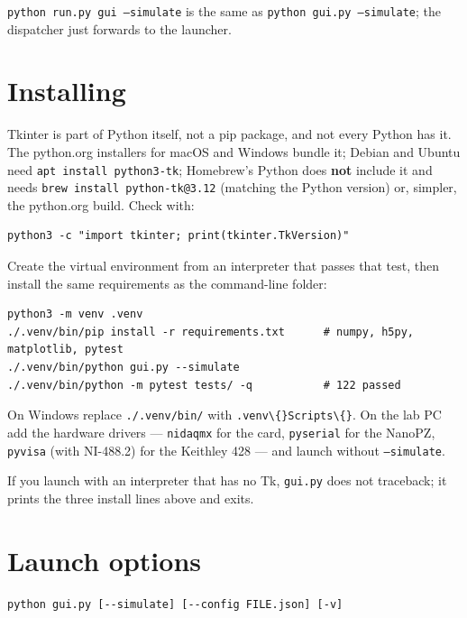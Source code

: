 \texttt{python run.\discretionary{}{}{}py gui --simulate} is the same as \texttt{python gui.\discretionary{}{}{}py --simulate}; the dispatcher just forwards to the launcher.

\section{Installing}

Tkinter is part of Python itself, not a pip package, and not every Python has it. The python.org installers for macOS and Windows bundle it; Debian and Ubuntu need \texttt{apt install python3-tk}; Homebrew's Python does \textbf{not} include it and needs \texttt{brew install python-tk@3.\discretionary{}{}{}12} (matching the Python version) or, simpler, the python.org build. Check with:

\begin{lstlisting}[style=out]
python3 -c "import tkinter; print(tkinter.TkVersion)"
\end{lstlisting}

Create the virtual environment from an interpreter that passes that test, then install the same requirements as the command-line folder:

\begin{lstlisting}[style=out]
python3 -m venv .venv
./.venv/bin/pip install -r requirements.txt      # numpy, h5py, matplotlib, pytest
./.venv/bin/python gui.py --simulate
./.venv/bin/python -m pytest tests/ -q           # 122 passed
\end{lstlisting}

On Windows replace \texttt{.\discretionary{}{}{}/\discretionary{}{}{}.\discretionary{}{}{}venv/\discretionary{}{}{}bin/\discretionary{}{}{}} with \texttt{.\discretionary{}{}{}venv\textbackslash\{\}Scripts\textbackslash\{\}}. On the lab PC add the hardware drivers --- \texttt{nidaqmx} for the card, \texttt{pyserial} for the NanoPZ, \texttt{pyvisa} (with NI-488.2) for the Keithley 428 --- and launch without \texttt{--simulate}.

If you launch with an interpreter that has no Tk, \texttt{gui.\discretionary{}{}{}py} does not traceback; it prints the three install lines above and exits.

\section{Launch options}

\begin{lstlisting}[style=out]
python gui.py [--simulate] [--config FILE.json] [-v]
\end{lstlisting}

